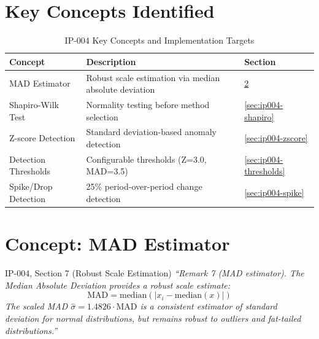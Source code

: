 \section{Key Concepts Identified}

\begin{table}[H]
\centering
\caption{IP-004 Key Concepts and Implementation Targets}
\label{tab:ip004-concepts}
\begin{tabularx}{\textwidth}{@{}p{3.5cm}Xl@{}}
\toprule
\textbf{Concept} & \textbf{Description} & \textbf{Section} \\
\midrule
MAD Estimator & Robust scale estimation via median absolute deviation & \ref{sec:ip004-mad} \\
Shapiro-Wilk Test & Normality testing before method selection & \ref{sec:ip004-shapiro} \\
Z-score Detection & Standard deviation-based anomaly detection & \ref{sec:ip004-zscore} \\
Detection Thresholds & Configurable thresholds (Z=3.0, MAD=3.5) & \ref{sec:ip004-thresholds} \\
Spike/Drop Detection & 25\% period-over-period change detection & \ref{sec:ip004-spike} \\
\bottomrule
\end{tabularx}
\end{table}

\section{Concept: MAD Estimator}
\label{sec:ip004-mad}

\begin{ipsourcebox}{IP-004, Section 7 (Robust Scale Estimation)}
\textit{``Remark 7 (MAD estimator). The Median Absolute Deviation provides a robust scale estimate:
$$\text{MAD} = \text{median}(|x_i - \text{median}(x)|)$$
The scaled MAD $\hat{\sigma} = 1.4826 \cdot \text{MAD}$ is a consistent estimator of standard deviation for normal distributions, but remains robust to outliers and fat-tailed distributions.''}
\end{ipsourcebox}

